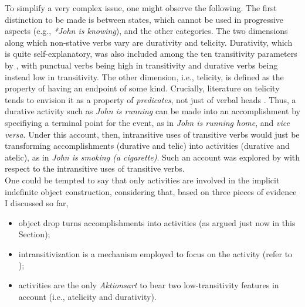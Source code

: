To simplify a very complex issue, one might observe the following. The first distinction to be made is between states, which cannot be used in progressive aspects (e.g., \textit{*John is knowing}), and the other categories. The two dimensions along which non-stative verbs vary are durativity and telicity. Durativity, which is quite self-explanatory, was also included among the ten transitivity parameters by \textcite{HopperThompson1980}, with punctual verbs being high in transitivity and durative verbs being instead low in transitivity. The other dimension, i.e., telicity, is defined as the property of having an endpoint of some kind. Crucially, literature on telicity tends to envision it as a property of \textit{predicates}, not just of verbal heads \parencite[270]{HopperThompson1980}. Thus, a durative activity such as \textit{John is running} can be made into an accomplishment by specifiying a terminal point for the event, as in \textit{John is running home}, and \textit{vice versa}. Under this account, then, intransitive uses of transitive verbs would just be transforming accomplishments (durative and telic) into activities (durative and atelic), as in \textit{John is smoking (a cigarette)}. Such an account was explored by \textcite{Mittwoch1982} with respect to the intransitive uses of transitive verbs.\\ %
One could be tempted to say that only activities are involved in the implicit indefinite object construction, considering that, based on three pieces of evidence I discussed so far,
\begin{itemize}
    \item object drop turns accomplishments into activities (as argued just now in this Section);
    \item intransitivization is a mechanism employed to focus on the activity (refer to );
    \item activities are the only \textit{Aktionsart} to bear two low-transitivity features in  account (i.e., atelicity and durativity).
\end{itemize}
